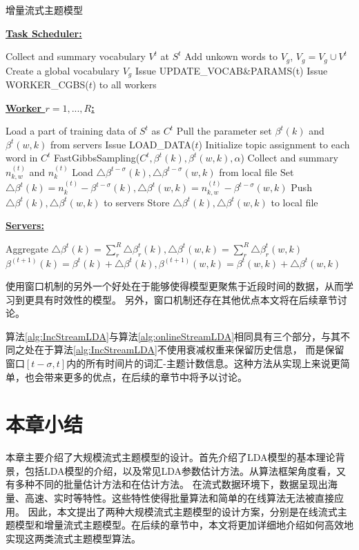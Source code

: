 \begin{algorithm}
\caption{增量流式主题模型}
\label{alg:IncStreamLDA}
\textbf{\underline{Task Scheduler:}}
\begin{algorithmic}[1]
\State Collect and summary vocabulary $V^t$ at $S^t$
\State Add unkown words to $V_g$, $V_g = V_g \cup V^t$
\EndFunction
\State Create a global vocabulary $V_g$
\State Issue UPDATE\_VOCAB\&PARAMS(t)
\State Issue WORKER\_CGBS($t$) to all workers
\EndFor
\end{algorithmic}
\textbf{\underline{Worker $r = 1, ..., R$:}}
\begin{algorithmic}[1]
\State Load a part of training data of $S^t$ as $C^t$
\State Pull the parameter set $\beta^t(k)$ and $\beta^t(w, k)$ from servers
\EndFunction
{}
\State Issue LOAD\_DATA($t$)
\State Initialize topic assignment to each word in $C^t$ 
\State FastGibbsSampling($C^t, \beta^t(k), \beta^t(w, k), \alpha$)
\EndFor
\State Collect and summary $n_{k,w}^{(t)}$ and $n_{k}^{(t)}$
\State Load $\bigtriangleup \beta^{t - \sigma}(k), \bigtriangleup \beta^{t - \sigma}(w, k)$ from local file
\State Set $\bigtriangleup \beta^t(k) = n_{k}^{(t)} - \beta^{t - \sigma}(k), \bigtriangleup \beta^t(w, k) = n_{k,w}^{(t)} - \beta^{t - \sigma}(w, k)$ 
\State Push $\bigtriangleup \beta^t(k), \bigtriangleup \beta^t(w, k)$ to servers
\State Store $\bigtriangleup \beta^t(k), \bigtriangleup \beta^t(w, k)$ to local file
\EndFunction
\end{algorithmic}
\textbf{\underline{Servers:}}
\begin{algorithmic}[1]
\State Aggregate $\bigtriangleup \beta^t(k) = \sum_r^R{\bigtriangleup \beta^t_r(k)}, \bigtriangleup \beta^t(w, k) = \sum_r^R{\bigtriangleup \beta^t_r(w, k)}$
\State $\beta^{(t+1)}(k) =\beta^t(k) +  \bigtriangleup \beta^t(k), \beta^{(t+1)}(w, k) = \beta^t(w, k) + \bigtriangleup \beta^t(w, k)$
\EndFunction
\end{algorithmic}
\end{algorithm}  

使用窗口机制的另外一个好处在于能够使得模型更聚焦于近段时间的数据，从而学习到更具有时效性的模型。
另外，窗口机制还存在其他优点本文将在后续章节讨论。

算法\ref{alg:IncStreamLDA}与算法\ref{alg:onlineStreamLDA}相同具有三个部分，与其不同之处在于算法\ref{alg:IncStreamLDA}不使用衰减权重来保留历史信息，
而是保留窗口$[t - \sigma, t]$内的所有时间片的词汇-主题计数信息。这种方法从实现上来说更简单，也会带来更多的优点，在后续的章节中将予以讨论。
\section{本章小结}
本章主要介绍了大规模流式主题模型的设计。首先介绍了LDA模型的基本理论背景，包括LDA模型的介绍，以及常见LDA参数估计方法。从算法框架角度看，又有多种不同的批量估计方法和在估计方法。
在流式数据环境下，数据呈现出海量、高速、实时等特性。这些特性使得批量算法和简单的在线算法无法被直接应用。
因此，本文提出了两种大规模流式主题模型的设计方案，分别是在线流式主题模型和增量流式主题模型。在后续的章节中，本文将更加详细地介绍如何高效地实现这两类流式主题模型算法。
